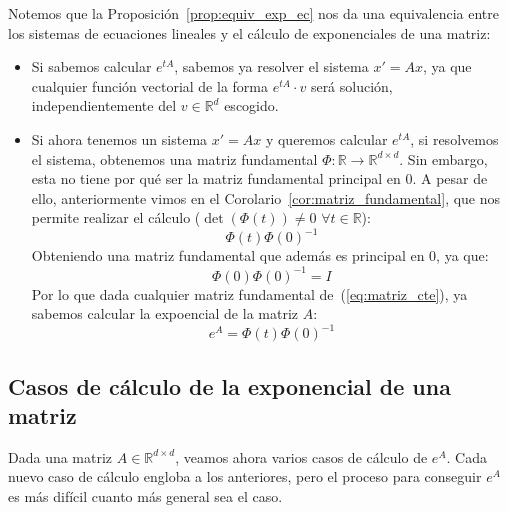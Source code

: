 \begin{observacion}
    Notemos que la Proposición~\ref{prop:equiv_exp_ec} nos da una equivalencia entre los sistemas de ecuaciones lineales y el cálculo de exponenciales de una matriz:
    \begin{itemize}
        \item Si sabemos calcular $e^{tA}$, sabemos ya resolver el sistema $x'=Ax$, ya que cualquier función vectorial de la forma $e^{tA}\cdot v$ será solución, independientemente del $v\in \mathbb{R}^d$ escogido.
        \item Si ahora tenemos un sistema $x'=Ax$ y queremos calcular $e^{tA}$, si resolvemos el sistema, obtenemos una matriz fundamental $\Phi:\mathbb{R}\rightarrow\mathbb{R}^{d\times d}$. Sin embargo, esta no tiene por qué ser la matriz fundamental principal en 0. A pesar de ello, anteriormente vimos en el Corolario~\ref{cor:matriz_fundamental}, que nos permite realizar el cálculo ($\det(\Phi(t))\neq 0$ $\forall t\in \mathbb{R}$):
            \begin{equation*}
                \Phi(t)\Phi(0)^{-1}
            \end{equation*}
            Obteniendo una matriz fundamental que además es principal en $0$, ya que:
            \begin{equation*}
                \Phi(0)\Phi(0)^{-1} = I
            \end{equation*}
            Por lo que dada cualquier matriz fundamental de~(\ref{eq:matriz_cte}), ya sabemos calcular la expoencial de la matriz $A$:
            \begin{equation*}
                e^A = \Phi(t)\Phi(0)^{-1}
            \end{equation*}
    \end{itemize}
\end{observacion}

\subsection{Casos de cálculo de la exponencial de una matriz}
Dada una matriz $A\in \mathbb{R}^{d\times d}$, veamos ahora varios casos de cálculo de $e^A$. Cada nuevo caso de cálculo engloba a los anteriores, pero el proceso para conseguir $e^A$ es más difícil cuanto más general sea el caso.

